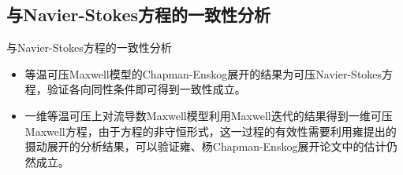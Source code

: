 \documentclass[mathserif]{beamer}
\begin{document}


\subsection{与Navier-Stokes方程的一致性分析}

\begin{frame}{与Navier-Stokes方程的一致性分析}
\begin{itemize}
\item<2-> 等温可压Maxwell模型的Chapman-Enskog展开的结果为可压Navier-Stokes方程，验证各向同性条件即可得到一致性成立。
\item<3-> 一维等温可压上对流导数Maxwell模型利用Maxwell迭代的结果得到一维可压Maxwell方程，由于方程的非守恒形式，这一过程的有效性需要利用雍提出的摄动展开的分析结果，可以验证雍、杨Chapman-Enskog展开论文中的估计仍然成立。
\end{itemize}
\end{frame}
\end{document}
